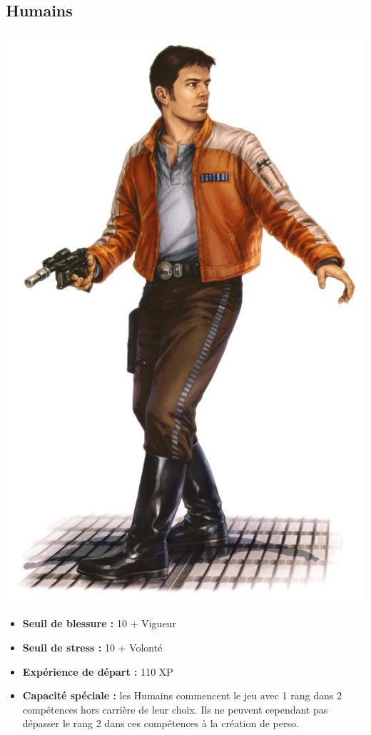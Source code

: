\documentclass[twoside]{article}
\begin{document}
\subsection*{Humains}

\noindent\begin{minipage}{0.3\textwidth}
	\includegraphics[width=1\linewidth]{../img/species/human}
\end{minipage}%
\hfill%
\begin{minipage}{0.7\textwidth}\raggedleft
	\begin{itemize}
		\item \textbf{Seuil de blessure :} 10 + Vigueur 
		\item \textbf{Seuil de stress :} 10 + Volonté 
		\item \textbf{Expérience de départ :} 110 XP
		\item \textbf{Capacité spéciale :} les Humains commencent le jeu avec 1 rang dans 2 compétences hors carrière de leur choix. Ils ne peuvent cependant pas dépasser le rang 2 dans ces compétences à la création de perso.
	\end{itemize}
\end{minipage}
\end{document}
